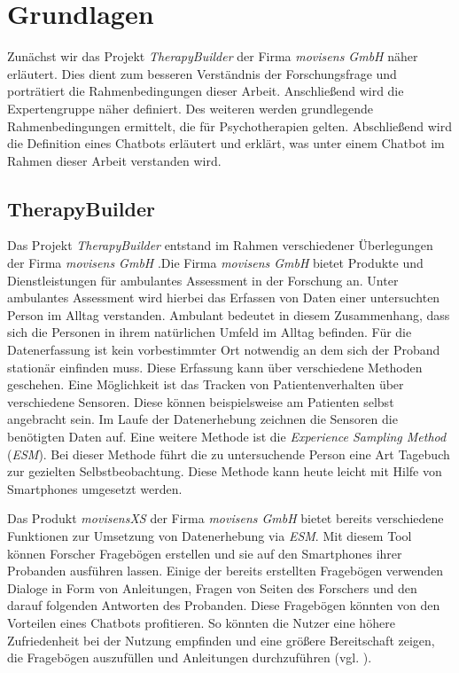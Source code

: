 
\chapter{Grundlagen}
\label{ch:Background}

Zunächst wir das Projekt \emph{TherapyBuilder} der Firma \emph{movisens GmbH} näher erläutert. Dies dient zum besseren Verständnis der Forschungsfrage und porträtiert die Rahmenbedingungen dieser Arbeit. Anschließend wird die Expertengruppe näher definiert. Des weiteren werden grundlegende Rahmenbedingungen ermittelt, die für Psychotherapien gelten. Abschließend wird die Definition eines Chatbots erläutert und erklärt, was unter einem Chatbot im Rahmen dieser Arbeit verstanden wird. 

\section{TherapyBuilder}

Das Projekt \emph{TherapyBuilder} entstand im Rahmen verschiedener Überlegungen der Firma \emph{movisens GmbH} .Die Firma \emph{movisens GmbH} bietet Produkte und Dienstleistungen für ambulantes Assessment in der Forschung an. Unter ambulantes Assessment wird hierbei das Erfassen von Daten einer untersuchten Person im Alltag verstanden. Ambulant bedeutet in diesem Zusammenhang, dass sich die Personen in ihrem natürlichen Umfeld im Alltag befinden. Für die Datenerfassung ist kein vorbestimmter Ort notwendig an dem sich der Proband stationär einfinden muss. Diese Erfassung kann über verschiedene Methoden geschehen. Eine Möglichkeit ist das Tracken von Patientenverhalten über verschiedene Sensoren. Diese können beispielsweise am Patienten selbst angebracht sein. Im Laufe der Datenerhebung zeichnen die Sensoren die benötigten Daten auf. Eine weitere Methode ist die \emph{Experience Sampling Method} (\emph{ESM}). Bei dieser Methode führt die zu untersuchende Person eine Art Tagebuch zur gezielten Selbstbeobachtung. Diese Methode kann heute leicht mit Hilfe von Smartphones umgesetzt werden.\cite{Assessme23:online} 

Das Produkt \emph{movisensXS} der Firma \emph{movisens GmbH} bietet bereits verschiedene Funktionen zur Umsetzung von Datenerhebung via \emph{ESM}. Mit diesem Tool können Forscher Fragebögen erstellen und sie auf den Smartphones ihrer Probanden ausführen lassen. Einige der bereits erstellten Fragebögen verwenden Dialoge in Form von Anleitungen, Fragen von Seiten des Forschers und den darauf folgenden Antworten des Probanden. Diese Fragebögen könnten von den Vorteilen eines Chatbots profitieren. So könnten die Nutzer eine höhere Zufriedenheit bei der Nutzung empfinden und eine größere Bereitschaft zeigen, die Fragebögen auszufüllen und Anleitungen durchzuführen (vgl. \cite{Fitzpatrick2017}). 

